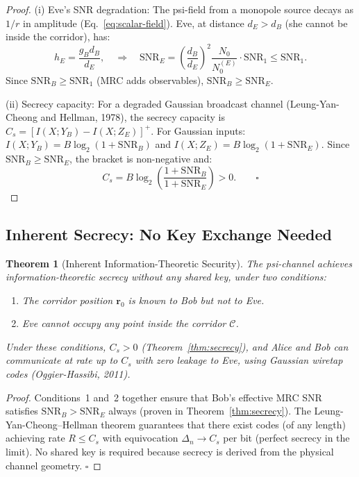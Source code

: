 \documentclass[aps,prd,twocolumn,superscriptaddress,nofootinbib]{revtex4-2}
\newcommand{\SNR}{\mathrm{SNR}}
\newcommand{\Corridor}{\mathcal{C}}
\newtheorem{theorem}{Theorem}
\begin{document}
\begin{proof}
(i) Eve's SNR degradation: The psi-field from a monopole source decays
as $1/r$ in amplitude (Eq.~\eqref{eq:scalar-field}). Eve, at distance
$d_E > d_B$ (she cannot be inside the corridor), has:
\begin{equation}
h_E = \frac{g_B d_B}{d_E}, \quad \Rightarrow \quad
\SNR_E = \left(\frac{d_B}{d_E}\right)^2 \frac{N_0}{N_0^{(E)}} \cdot \SNR_1
\leq \SNR_1.
\end{equation}
Since $\SNR_B \geq \SNR_1$ (MRC adds observables), $\SNR_B \geq \SNR_E$.

(ii) Secrecy capacity: For a degraded Gaussian broadcast channel
(Leung-Yan-Cheong and Hellman, 1978), the secrecy capacity is
$C_s = [I(X;Y_B) - I(X;Z_E)]^+$. For Gaussian inputs:
$I(X;Y_B) = B\log_2(1 + \SNR_B)$ and $I(X;Z_E) = B\log_2(1 + \SNR_E)$.
Since $\SNR_B \geq \SNR_E$, the bracket is non-negative and:
\begin{equation}
C_s = B\log_2\!\left(\frac{1+\SNR_B}{1+\SNR_E}\right) > 0. \qquad\square
\end{equation}
\end{proof}

\subsection{Inherent Secrecy: No Key Exchange Needed}

\begin{theorem}[Inherent Information-Theoretic Security]
\label{thm:inherent}
The psi-channel achieves information-theoretic secrecy without any shared
key, under two conditions:
\begin{enumerate}
\item The corridor position $\mathbf{r}_0$ is known to Bob but not to Eve.
\item Eve cannot occupy any point inside the corridor $\Corridor$.
\end{enumerate}
Under these conditions, $C_s > 0$ (Theorem~\ref{thm:secrecy}), and Alice
and Bob can communicate at rate up to $C_s$ with zero leakage to Eve,
using Gaussian wiretap codes (Oggier-Hassibi, 2011).
\end{theorem}

\begin{proof}
Conditions~1 and~2 together ensure that Bob's effective MRC SNR satisfies
$\SNR_B > \SNR_E$ always (proven in Theorem~\ref{thm:secrecy}). The
Leung-Yan-Cheong--Hellman theorem guarantees that there exist codes (of
any length) achieving rate $R \leq C_s$ with equivocation
$\Delta_n \to C_s$ per bit (perfect secrecy in the limit). No shared key
is required because secrecy is derived from the physical channel geometry.
$\square$
\end{proof}
\end{document}
